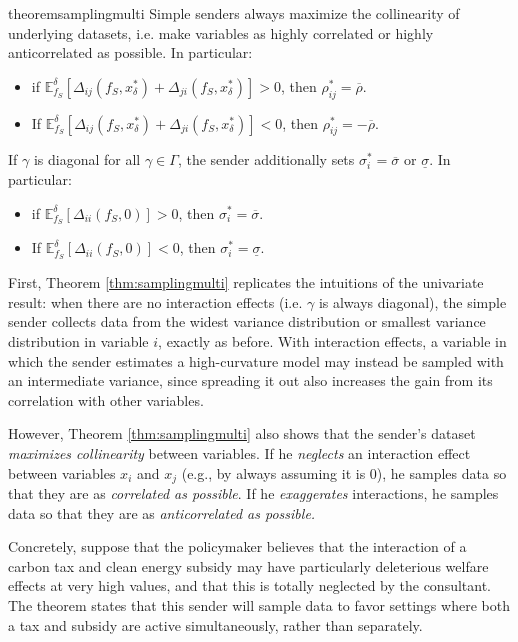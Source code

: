 \documentclass[11pt,dvipsnames]{article}
\begin{document}
\begin{restatable}{theorem}{samplingmulti}
Simple senders always maximize the collinearity of underlying datasets, i.e. make variables as highly correlated or highly anticorrelated as possible.
In particular:
\begin{itemize}
\item if $\mathbb{E}_{f_S}^\delta[\Delta_{ij}(f_S,x_\delta^*)+\Delta_{ji}(f_S,x_\delta^*)] > 0$, then $\rho_{ij}^* = \overline{\rho}$.
\item If $\mathbb{E}_{f_S}^\delta[\Delta_{ij}(f_S,x_\delta^*)+\Delta_{ji}(f_S,x_\delta^*)] < 0$, then $\rho_{ij}^* = -\overline{\rho}$.
\end{itemize}
If $\gamma$ is diagonal for all $\gamma \in \Gamma$, the sender additionally sets $\sigma_i^* = \overline{\sigma}$ or $\underline{\sigma}$. In particular:
\begin{itemize}
\item if $\mathbb{E}_{f_S}^\delta[\Delta_{ii}(f_S,0)] > 0$, then $\sigma_{i}^*=\overline{\sigma}$.
\item If $\mathbb{E}_{f_S}^\delta[\Delta_{ii}(f_S,0)] < 0$, then $\sigma_{i}^*=\underline{\sigma}$.	
\end{itemize}
\label{thm:samplingmulti}
\end{restatable}

First, Theorem \ref{thm:samplingmulti} replicates the intuitions of the univariate result: when there are no interaction effects (i.e. $\gamma$ is always diagonal), the simple sender collects data from the widest variance distribution or smallest variance distribution in variable $i$, exactly as before.
With interaction effects, a variable in which the sender estimates a high-curvature model may instead be sampled with an intermediate variance, since spreading it out also increases the gain from its correlation with other variables.

However, Theorem \ref{thm:samplingmulti} also shows that the sender's dataset \emph{maximizes collinearity} between variables.
If he \emph{neglects} an interaction effect between variables $x_i$ and $x_j$ (e.g., by always assuming it is $0$), he samples data so that they are as \emph{correlated as possible}.
If he \emph{exaggerates} interactions, he samples data so that they are as \emph{anticorrelated as possible.}

Concretely, suppose that the policymaker believes that the interaction of a carbon tax and clean energy subsidy may have particularly deleterious welfare effects at very high values, and that this is totally neglected by the consultant.
The theorem states that this sender will sample data to favor settings where both a tax and subsidy are active simultaneously, rather than separately.
\end{document}
